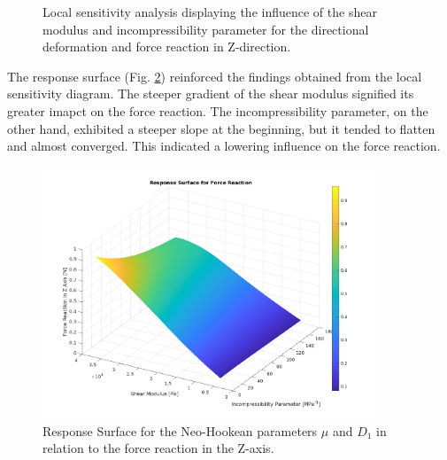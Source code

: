\begin{figure}%
    \centering
	\caption[Local sensitivity analysis - Initial parameter range]{Local sensitivity analysis displaying the influence of the shear modulus and incompressibility parameter for the directional deformation and force reaction in Z-direction.}%
	\label{fig:fullrangelocalsensi}%
 \end{figure}

The response surface (Fig. \ref{fig:rsoforce}) 
reinforced the findings obtained from the local sensitivity diagram. The steeper gradient of the shear modulus 
signified its greater imapct on the force reaction. The incompressibility parameter, on the other hand, 
exhibited a steeper slope at the beginning, but it tended to flatten and almost converged. This indicated 
a lowering influence on the force reaction.

\begin{figure}%
	\centering
   \quad
   \includegraphics[width=10cm]{Images/ifem/plat NH 4 and 2 fullrange/rsoforce1.png}%
   \caption[Response surface - Force Reaction]{Response Surface for the Neo-Hookean parameters $\mu$ and $D_1$ in relation to the force reaction in the Z-axis.}%
   \label{fig:rsoforce}%
\end{figure}


